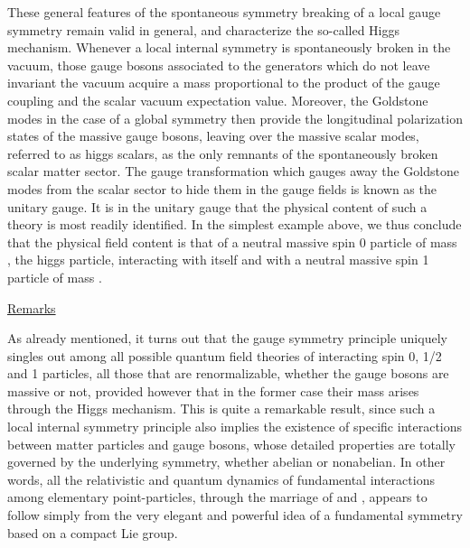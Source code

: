 \documentclass[a4paper,11pt]{article}
\begin{document}
These general features of the spontaneous symmetry breaking of a local gauge
symmetry remain valid in general, and characterize the so-called Higgs 
mechanism. Whenever a local internal symmetry is spontaneously broken
in the vacuum, those gauge bosons associated to the generators which do not
leave invariant the vacuum acquire a mass proportional to the product of
the gauge coupling and the scalar vacuum expectation value. Moreover,
the Goldstone modes in the case of a global symmetry then provide
the longitudinal polarization states of the massive gauge bosons, leaving 
over the massive scalar modes, referred to as higgs scalars, as the only 
remnants of the spontaneously broken scalar matter sector.
The gauge transformation which gauges away the Goldstone modes from the scalar
sector to hide them in the gauge fields is known as the unitary gauge.
It is in the unitary gauge that the physical content of such a theory
is most readily identified. In the simplest example above, we thus conclude
that the physical field content is that of a neutral massive spin 0 particle 
of mass \coordHE{}, the higgs particle, interacting with itself
and with a neutral massive spin 1 particle of mass \coordHE{}.

\vspace{10pt}

\noindent\underline{Remarks}

\vspace{5pt}

As already mentioned, it turns out that the gauge symmetry principle
uniquely singles out among all possible quantum field theories of
interacting spin 0, 1/2 and 1 particles, all those that are
renormalizable, whether the gauge bosons are massive or not, provided
however that in the former case their mass arises through the Higgs
mechanism.\cite{HV} This is quite a re\-mar\-ka\-ble result, since such a local 
internal symmetry principle also implies the existence of specific interactions
between matter particles and gauge bosons, whose detailed properties are
totally governed by the underlying symmetry, whether abelian or nonabelian.
In other words, all the relativistic and quantum dynamics of fundamental
interactions among elementary point-particles, through the marriage of 
\myHighlight{$\hbar$}\coordHE{} and \coordHE{}, appears to follow simply from the very elegant and powerful
idea of a fundamental symmetry based on a compact Lie group.
\end{document}
